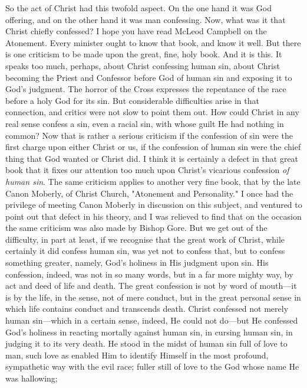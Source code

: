 \documentclass[draft]{ptfdoc}
\begin{document}
So the act of Christ had this twofold aspect. 
On the one hand it was God offering, and on the 
other hand it was man confessing. Now, what 
was it that Christ chiefly confessed? I hope you 
have read McLeod Campbell on the Atonement. 
Every minister ought to know that book, and 
know it well. But there is one criticism to be 
made upon the great, fine, holy book. And it 
is this. It speaks too much, perhaps, about 
Christ confessing human sin, about Christ 
becoming the Priest and Confessor before God 
of human sin and exposing it to God's judgment. 
The horror of the Cross expresses the repentance 
of the race before a holy God for its sin. 
But considerable difficulties arise in that connection, 
and critics were not slow to point them 
out. How could Christ in any real sense confess 
a sin, even a racial sin, with whose guilt He 
had nothing in common? Now that is rather a 
serious criticism if the confession of sin were 
the first charge upon either Christ or us, if the 
confession of human sin were the chief thing 
that God wanted or Christ did. I think it is 
certainly a defect in that great book that 
it fixes our attention too much upon Christ's 
vicarious confession \textit{of human sin}. The same 
criticism applies to another very fine book, 
that by the late Canon Moberly, of Christ 
Church, "Atonement and Personality." I once 
had the privilege of meeting Canon Moberly 
in discussion on this subject, and ventured to 
point out that defect in his theory, and I was 
relieved to find that on the occasion the same 
criticism was also made by Bishop Gore. But 
we get out of the difficulty, in part at least, if we 
recognise that the great work of Christ, while 
certainly it did confess human sin, was yet not 
to confess that, but to confess something greater, 
namely, God's holiness in His judgment upon 
sin. His confession, indeed, was not in so many 
words, but in a far more mighty way, by act and 
deed of life and death. The great confession is 
not by word of mouth---it is by the life, in the 
sense, not of mere conduct, but in the great 
personal sense in which life contains conduct 
and transcends death. Christ confessed not 
merely human sin---which in a certain sense, 
indeed, He could not do---but He confessed God's 
holiness in reacting mortally against human sin, 
in cursing human sin, in judging it to its very 
death. He stood in the midst of human sin 
full of love to man, such love as enabled Him 
to identify Himself in the most profound, sympathetic 
way with the evil race; fuller still of 
love to the God whose name He was hallowing; 
\end{document}
